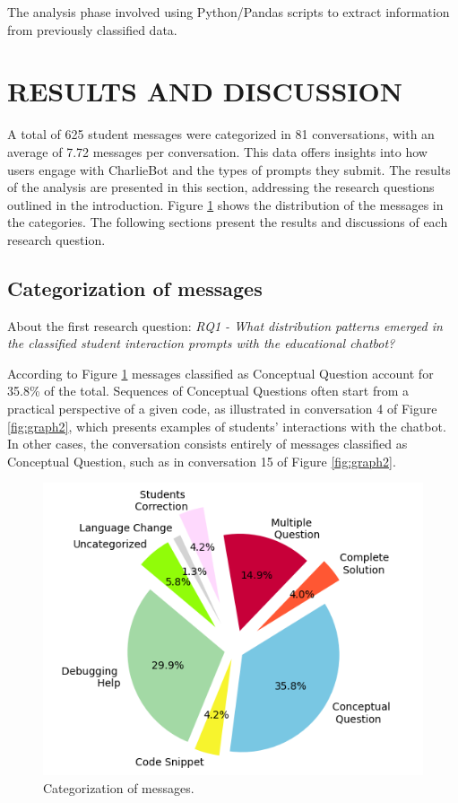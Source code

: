 \documentclass[a4paper,twoside]{article}
\begin{document}
The analysis phase involved using Python/Pandas scripts to extract information
from previously classified data.

\section{\uppercase{Results and Discussion}}

A total of 625 student messages were categorized in 81 conversations, with
an average of 7.72 messages per conversation. This data offers insights into how
users engage with CharlieBot and the types of prompts they submit. The results
of the analysis are presented in this section, addressing the research questions
outlined in the introduction. Figure \ref{fig:graph1} shows the distribution of
the messages in the categories. The following sections present the results and
discussions of each research question.

\subsection{Categorization of messages}

About the first research question: \textit{RQ1 - What distribution patterns
emerged in the classified student interaction prompts with the educational
chatbot?}

According to Figure \ref{fig:graph1} messages classified as
Conceptual Question account for 35.8\% of the total. Sequences of Conceptual
Questions often start from a practical perspective of a given code, as
illustrated in conversation 4 of Figure \ref{fig:graph2}, which presents
examples of students' interactions with the chatbot. In other cases, the
conversation consists entirely of messages classified as Conceptual Question,
such as in conversation 15 of Figure \ref{fig:graph2}.

\begin{figure}[h!]
  \centering
  \includegraphics[scale=0.6]{img/figure1.png}
  \caption{Categorization of messages.}
  \label{fig:graph1}
\end{figure}
\end{document}

